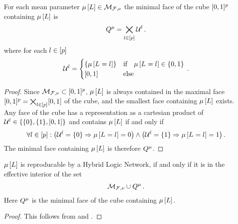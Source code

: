 \begin{lemma}\label{lem:minimalContainingFace}
    For each mean parameter $\mu\left[L\right]\in\mathcal{M}_{\mathcal{F},\nu}$ the minimal face of the cube $[0,1]^{p}$ containing $\mu\left[L\right]$ is
    \begin{align*}
        Q^{\mu}
        = \bigtimes_{l\in[p]} \mathcal{U}^{l} \, .
    \end{align*}
    where for each $l\in[p]$
    \begin{align*}
        \mathcal{U}^{l} = \begin{cases}
            \{\mu\left[L_{}=l_{}\right]\} & \text{if} \quad \mu\left[L_{}=l_{}\right] \in \{0,1\} \\
            [0,1] & \text{else}
        \end{cases} \, .
    \end{align*}
\end{lemma}
\begin{proof}
    Since $\mathcal{M}_{\mathcal{F},\nu}\subset[0,1]^{p}$, $\mu\left[L\right]$ is always contained in the maximal face $[0,1]^{p}=\bigtimes_{l\in[p]}[0,1]$ of the cube, and the smallest face containing $\mu\left[L\right]$ exists.
    Any face of the cube has a representation as a cartesian product of $\mathcal{U}^{l}\in\{\{0\},\{1\},[0,1]\}$ and contains $\mu\left[L\right]$ if and only if
    \begin{align*}
        \forall{l\in[p]}:{\left(\mathcal{U}^{l}=\{0\} \Rightarrow \mu\left[L_{}=l_{}\right]=0 \right) \land \left(\mathcal{U}^{l}=\{1\} \Rightarrow \mu\left[L_{}=l_{}\right]=1 \right)} \, .
    \end{align*}
    The minimal face containing $\mu\left[L\right]$ is therefore $Q^{\mu}$.
\end{proof}

\begin{theorem}
    $\mu\left[L\right]$ is reproducable by a Hybrid Logic Network, if and only if it is in the effective interior of the set
    \begin{align*}
        \mathcal{M}_{\mathcal{F},\nu}\cup Q^{\mu} \, .
    \end{align*}
    Here $Q^{\mu}$ is the minimal face of the cube containing $\mu\left[L\right]$.
\end{theorem}
\begin{proof}
    This follows from  and .
\end{proof}

